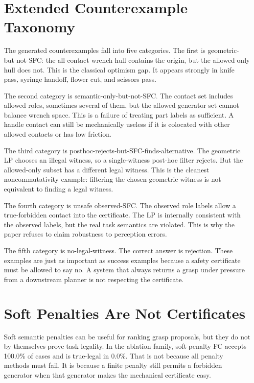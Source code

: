 \documentclass{article}
\begin{document}
\section{Extended Counterexample Taxonomy}

The generated counterexamples fall into five categories. The first is geometric-but-not-SFC: the all-contact wrench hull contains the origin, but the allowed-only hull does not. This is the classical optimism gap. It appears strongly in knife pass, syringe handoff, flower cut, and scissors pass.

The second category is semantic-only-but-not-SFC. The contact set includes allowed roles, sometimes several of them, but the allowed generator set cannot balance wrench space. This is a failure of treating part labels as sufficient. A handle contact can still be mechanically useless if it is colocated with other allowed contacts or has low friction.

The third category is posthoc-rejects-but-SFC-finds-alternative. The geometric LP chooses an illegal witness, so a single-witness post-hoc filter rejects. But the allowed-only subset has a different legal witness. This is the cleanest noncommutativity example: filtering the chosen geometric witness is not equivalent to finding a legal witness.

The fourth category is unsafe observed-SFC. The observed role labels allow a true-forbidden contact into the certificate. The LP is internally consistent with the observed labels, but the real task semantics are violated. This is why the paper refuses to claim robustness to perception errors.

The fifth category is no-legal-witness. The correct answer is rejection. These examples are just as important as success examples because a safety certificate must be allowed to say no. A system that always returns a grasp under pressure from a downstream planner is not respecting the certificate.

\section{Soft Penalties Are Not Certificates}

Soft semantic penalties can be useful for ranking grasp proposals, but they do not by themselves prove task legality. In the ablation family, soft-penalty FC accepts 100.0\% of cases and is true-legal in 0.0\%. That is not because all penalty methods must fail. It is because a finite penalty still permits a forbidden generator when that generator makes the mechanical certificate easy.
\end{document}
